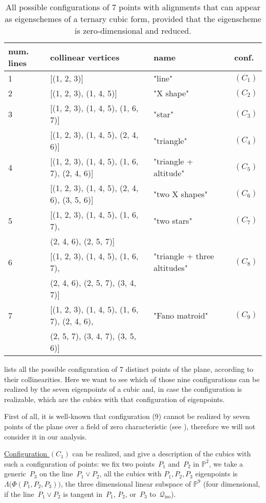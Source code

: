 \documentclass{amsart}
\theoremstyle{plain}
\theoremstyle{definition}
\newcommand{\p}{\mathbb{P}}
\newcommand{\iso}{\mathcal{Q}_{\mathrm{iso}}}
\begin{document}
\begin{table}
\caption{All possible configurations of $7$ points with alignments that can appear as eigenschemes of a ternary cubic form, provided that the eigenscheme is zero-dimensional and reduced.}
\centering
\begin{tabular}{|llll|}\hline
  num. lines & collinear vertices & name & conf.\\ \hline
 1& [(1, 2, 3)] & "line" & $(C_1)$\\
 2& [(1, 2, 3), (1, 4, 5)] & "X shape"& $(C_2)$\\
 3& [(1, 2, 3), (1, 4, 5), (1, 6, 7)] & "star" & $(C_3)$\\
  & [(1, 2, 3), (1, 4, 5), (2, 4, 6)] & "triangle" & $(C_4)$\\
 4& [(1, 2, 3), (1, 4, 5), (1, 6, 7), (2, 4, 6)] & "triangle + altitude"
& $(C_5)$\\
  & [(1, 2, 3), (1, 4, 5), (2, 4, 6), (3, 5, 6)] & "two X shapes" & $(C_6)$\\
 5& [(1, 2, 3), (1, 4, 5), (1, 6, 7), & "two stars" & $(C_7)$\\
  & \phantom{[}(2, 4, 6), (2, 5, 7)] & &\\
 6& [(1, 2, 3), (1, 4, 5), (1, 6, 7), & "triangle + three altitudes" & $(C_8)$\\
  & \phantom{[} (2, 4, 6), (2, 5, 7), (3, 4, 7)] & & \\
 7& [(1, 2, 3),
   (1, 4, 5),
   (1, 6, 7),
   (2, 4, 6), & "Fano matroid" & $(C_9)$\\
  & \phantom{[} (2, 5, 7),
   (3, 4, 7),
   (3, 5, 6)] & & \\ \hline
\end{tabular}
\label{table:all_alignments}
\end{table}

 lists all the possible configuration
of 7 distinct points of the plane, according to their collinearities. Here
we want to see which of those nine configurations can be realized by
the seven eigenpoints of a cubic and, in case the configuration is
realizable, which are the cubics with that configuration of eigenpoints.

First of all, it is well-known that configuration (9) cannot be realized
by seven points of the plane over a field of zero
characteristic (see \cite{Whitney1935}), therefore we will not consider
it in our analysis.

\underline{Configuration $(C_1)$} can be realized,
 and 
give a description of the cubics with such a configuration of points:
we fix two points~$P_1$ and~$P_2$ in $\p^2$, we take a generic~$P_3$
on the line~$P_1 \vee P_2$, all the cubics with
$P_1, P_2, P_3$ eigenpoints is $\Lambda \bigl( \Phi(P_1, P_2, P_3) \bigr)$, the three
dimensional linear subspace of $\p^9$ (four dimensional, if the
line~$P_1 \vee P_2$ is tangent in~$P_1$, $P_2$, or~$P_3$ to~$\iso$).
\end{document}
